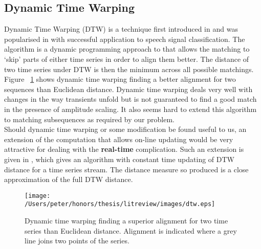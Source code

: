 	\subsection{Dynamic Time Warping}
	Dynamic Time Warping (DTW) is a technique first introduced in \citep{sakoe1978dynamic} and was popularised in \citep{berndt1994using} with successful application to speech signal classification. The algorithm is a dynamic programming approach to that allows the matching to `skip' parts of either time series in order to align them better. The distance of two time series under DTW is then the minimum across all possible matchings. Figure ~\ref{fig:dtwinaction} shows dynamic time warping finding a better alignment for two sequences than Euclidean distance. Dynamic time warping deals very well with changes in the way transients unfold but is not guaranteed to find a good match in the presence of amplitude scaling. It also seems hard to extend this algorithm to matching subsequences as required by our problem.
	\\
	Should dynamic time warping or some modification be found useful to us, an extension of the computation that allows on-line updating would be very attractive for dealing with the \textbf{real-time} complication. Such an extension is given in \citep{capitani2007warping}, which gives an algorithm with constant time updating of DTW distance for a time series stream. The distance measure so produced is a close approximation of the full DTW distance.
	
	\begin{figure}[h!]
			\label{fig:dtwinaction}
	\centering
	\texttt{[image: /Users/peter/honors/thesis/litreview/images/dtw.eps]}
	\caption{Dynamic time warping finding a superior alignment for two time series than Euclidean distance. Alignment is indicated where a grey line joins two points of the series.}
	\end{figure}

